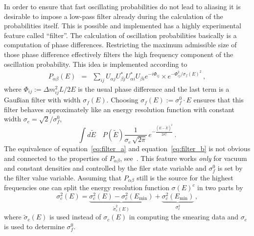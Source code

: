 In order to ensure that fast oscillating probabilities do not lead to aliasing
it is desirable to impose a low-pass filter already during the calculation
of the probabilities itself. This is possible and implemented has a highly
experimental feature called ``filter''. 
The calculation of oscillation
probabilities basically is a computation of phase differences. Restricting
the maximum admissible size of those phase difference effectively filters
the high frequency component of the oscillation probability. This idea is
implemented according to
\begin{eqnarray}
\label{eq:filter_a}
P_{\alpha\beta}(E)&=&\sum_{ij}
U_{\alpha j} U^*_{\beta j} U^*_{\alpha i} U_{\beta i} 
e^{-i\Phi_{ij}}\times 
e^{ -\Phi_{ij}^2/\sigma_f(E)^2 }\,,
\end{eqnarray}
where $\Phi_{ij}:=\Delta m_{ij}^2 L/2E$ is the usual phase difference and
the last term is a Gau\ss ian filter with width $\sigma_f(E)$. Choosing
$\sigma_f(E):=\sigma_f^0 \cdot E$ ensures that this filter behaves 
approximately like an energy resolution function with constant width 
$\sigma_e=\sqrt{2}/\sigma_f^0$, \ie\
\begin{equation}
\label{eq:filter_b}
\int d\tilde E\quad P(\tilde E) \frac{1}{\sigma_e\,\sqrt{2\pi}}\,
e^{-\frac{(E-\tilde E)^2}{2\sigma^2_e}}\,.
\end{equation}
The equivalence of equation~\ref{eq:filter_a} and equation~\ref{eq:filter_b}
is not obvious and connected to the properties of $P_{\alpha\beta}$, 
see~\cite{Kiers:1996zj,Giunti:2003ax}. This feature works \emph{only} 
for vacuum and constant densities and controlled
by the filer state variable and $\sigma_f^0$ is set by the filter value 
variable. Assuming that $P_{\alpha\beta}$ still is the source for the highest
frequencies one can split the energy resolution function $\sigma(E)^c$ in
two parts by
\begin{equation}
\sigma_c^2(E)=\underbrace{\sigma_c^2(E)-\sigma_c^2(E_\mathrm{min})}_
{\tilde\sigma^2_c(E)}+\underbrace{\sigma_c^2(E_\mathrm{min})}_{\sigma_e^2}\,,
\end{equation}
where $\tilde\sigma_c(E)$ is used instead of $\sigma_c(E)$ in computing the
smearing data and $\sigma_e$ is used to determine $\sigma_f^0$.

